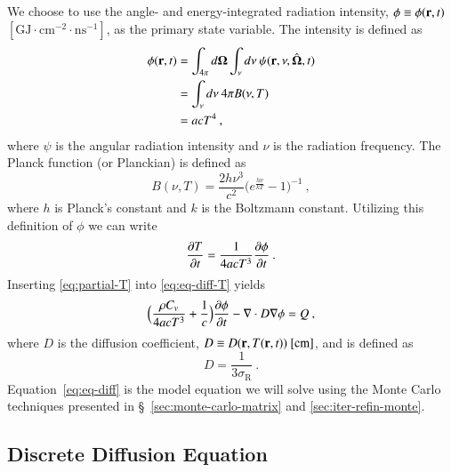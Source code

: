 \documentclass[preprint,12pt]{elsarticle}
\newcommand{\Cv}{\ensuremath{C_{v}}}
\newcommand{\ros}{\ensuremath{\sigma_{\scriptscriptstyle\mathrm{R}}}}
\newcommand{\bOmega}{\ensuremath{\mathbf{\Omega}}}
\begin{document}
We choose to use the angle- and energy-integrated radiation intensity,
$\phi\equiv\phi(\mathbf{r},t)$
$[\text{GJ}\cdot\text{cm}^{-2}\cdot\text{ns}^{-1}]$, as the primary state
variable.  The intensity is defined as
\begin{equation}
  \label{eq:lte-phi}
  \begin{split}
    \phi(\ve{r},t) &=
    \int_{4\pi}d\bOmega\int_{\nu}d\nu\:\psi(\ve{r},\nu,\hat{\bOmega},t)
    \\ &= \int_{\nu}d\nu\: 4\pi B(\nu,T) \\ &= acT^{4}\:,
  \end{split}
\end{equation}
where $\psi$ is the angular radiation intensity and $\nu$ is the radiation
frequency.  The Planck function (or Planckian) is defined as
\begin{equation}
  B(\nu,T)=\frac{2h\nu^{3}}{c^{2}}\bigl(e^{\frac{h\nu}{kT}} -
  1\bigr)^{-1}\:,
\end{equation}
where $h$ is Planck's constant and $k$ is the Boltzmann constant.  Utilizing
this definition of $\phi$ we can write
\begin{equation}
  \label{eq:partial-T}
  \frac{\partial T}{\partial t} = \frac{1}{4acT^{3}}\frac{\partial \phi}{\partial t}\:.
\end{equation}
Inserting \eqref{eq:partial-T} into \eqref{eq:eq-diff-T} yields
\begin{equation}
  \label{eq:eq-diff}
  \Bigl(\frac{\rho\Cv}{4acT^{3}} + \frac{1}{c}\Bigr)\pder{\phi}{t} -
  \nabla\cdot D\grad{\phi} = Q\:,
\end{equation}
where $D$ is the diffusion coefficient, $D\equiv
D(\mathbf{r},T(\mathbf{r},t))\ [\text{cm}]$, and is defined as
\begin{equation}
  D = \frac{1}{3\ros}\:.
\end{equation}
Equation~\eqref{eq:eq-diff} is the model equation we will solve using the
Monte Carlo techniques presented in \S~\ref{sec:monte-carlo-matrix} and
\ref{sec:iter-refin-monte}.

\subsection{Discrete Diffusion Equation}
\end{document}
